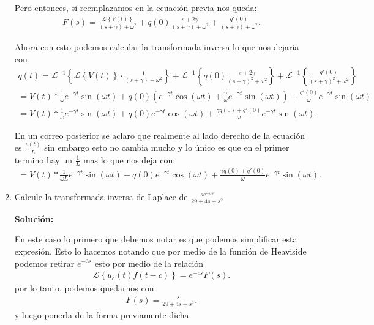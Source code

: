 \documentclass[12pt]{exam}
\newcommand{\La}{\mathscr{L}}
\begin{document}
\begin{enumerate}
	Pero entonces, si reemplazamos en la ecuación previa nos queda:
	\begin{align*}
	  F\left( s \right) = \frac{\La\left\{ V\left( t \right)  \right\} }{\left( s + \gamma \right) + \omega^2} + q\left( 0 \right) \frac{s+2\gamma}{\left( s + \gamma \right) + \omega^2} + \frac{q'\left( 0 \right) }{\left( s + \gamma \right) + \omega^2}
	.\end{align*}

	Ahora con esto podemos calcular la transformada inversa lo que nos dejaria con
	\begin{align*}
	  q\left( t \right) = \La^{-1}\left\{ \La\left\{V\left( t \right)\right\} \cdot \frac{1}{\left( s + \gamma \right) + \omega^2} \right\} + \La^{-1}\left\{ q\left( 0 \right) \frac{s+2\gamma}{\left( s+\gamma \right)^2+\omega^2} \right\} + \La^{-1}\left\{ \frac{q'\left( 0 \right) }{\left( s+\gamma \right)^2+\omega^2} \right\} \\
	  = V\left( t \right) * \frac{1}{\omega}e^{-\gamma t}\sin\left( \omega t \right) + q\left( 0 \right) \left( e^{-\gamma t}\cos\left( \omega t \right) + \frac{\gamma}{\omega}e^{-\gamma t}\sin\left( \omega t \right)  \right) + \frac{q'\left( 0 \right) }{\omega} e^{-\gamma t}\sin\left( \omega t \right) \\
	  = V\left( t \right) * \frac{1}{\omega}e^{-\gamma t}\sin\left( \omega t \right) + q\left( 0 \right) e^{-\gamma t}\cos\left( \omega t \right) + \frac{\gamma q\left( 0 \right) + q'\left( 0 \right) }{\omega}e^{-\gamma t}\sin\left( \omega t \right) 
	.\end{align*}

	En un correo posterior se aclaro que realmente al lado derecho de la ecuación es $\frac{v\left( t \right) }{L}$ sin embargo esto no cambia mucho y lo único es que en el primer termino hay un $\frac{1}{L}$ mas lo que nos deja con:
	\begin{align*}
	  = V\left( t \right) * \frac{1}{\omega L}e^{-\gamma t}\sin\left( \omega t \right) + q\left( 0 \right) e^{-\gamma t}\cos\left( \omega t \right) + \frac{\gamma q\left( 0 \right) + q'\left( 0 \right) }{\omega}e^{-\gamma t}\sin\left( \omega t \right) 
	.\end{align*}
  \item Calcule la transformada inversa de Laplace de $\frac{s e^{-3s}}{29+4s+s^2}$
    
    \textbf{Solución:}

    En este caso lo primero que debemos notar es que podemos simplificar esta expresión. Esto lo hacemos notando que por medio de la función de Heaviside podemos retirar $e^{-3s}$ esto por medio de la relación
    \begin{align*}
      \La\left\{ u_c\left( t \right) f\left( t-c \right)  \right\} = e^{-cs}F\left( s \right) 
    .\end{align*}
    por lo tanto, podemos quedarnos con
    \begin{align*}
      F\left( s \right) = \frac{s}{29+4s+s^2}
    .\end{align*}
    y luego ponerla de la forma previamente dicha.


\end{enumerate}
\end{document}
